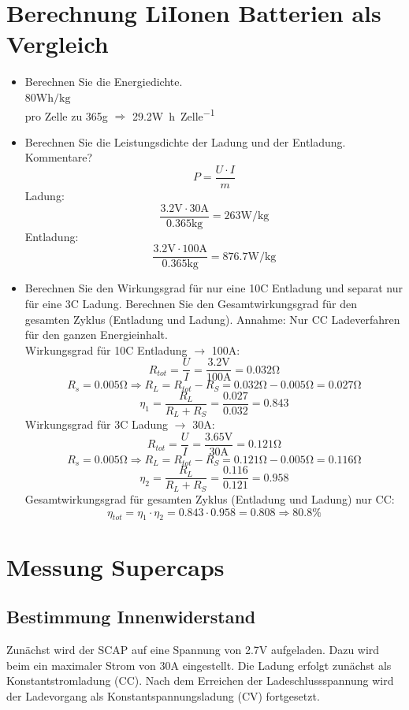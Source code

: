 \documentclass[a4,paper,fleqn]{article}
\begin{document}
\clearpage
\section{Berechnung LiIonen Batterien als Vergleich}
\begin{itemize}
\item Berechnen Sie die Energiedichte. \\
    $80\si{\watt\hour\per\kilogram}$ \\
    pro Zelle zu 365\si{\gram} $\Rightarrow$ 29.2\si{\watt\hour\per Zelle}
\item Berechnen Sie die Leistungsdichte der Ladung und der Entladung. 
Kommentare? \\
    \[ P = \frac{U \cdot I}{m} \]
    Ladung: 
    \[ \frac{3.2\si{\volt} \cdot 30\si{\ampere}}{0.365\si{\kilogram}} = 263 \si{\watt\per\kilogram} \]
    Entladung: 
    \[ \frac{3.2\si{\volt} \cdot 100\si{\ampere}}{0.365\si{\kilogram}} = 876.7 \si{\watt\per\kilogram} \]
\item  Berechnen Sie den Wirkungsgrad für nur eine 10C Entladung und separat 
nur für eine 3C Ladung.  Berechnen Sie den Gesamtwirkungsgrad für den 
gesamten Zyklus (Entladung und Ladung).  Annahme: Nur CC Ladeverfahren für 
den ganzen Energieinhalt. \\
    Wirkungsgrad für 10C Entladung $\to$ 100\si{\ampere}: 
    \[ R_{tot} = \frac{U}{I} = \frac{3.2\si{\volt}}{100\si{\ampere}} 
    = 0.032\si{\ohm} \]
    \[ R_s = 0.005\si{\ohm} \Rightarrow R_L 
    = R_{tot} - R_S = 0.032\si{\ohm} - 0.005\si{\ohm} = 0.027\si{\ohm} \]
    \[ \eta_1 = \frac{R_L}{R_L + R_S} = \frac{0.027}{0.032} = 0.843 \]
    Wirkungsgrad für 3C Ladung $\to$ 30\si{\ampere}: 
    \[ R_{tot} = \frac{U}{I} = \frac{3.65\si{\volt}}{30\si{\ampere}} 
    = 0.121\si{\ohm} \]
    \[ R_s = 0.005\si{\ohm} \Rightarrow R_L 
    = R_{tot} - R_S = 0.121\si{\ohm} - 0.005\si{\ohm} = 0.116\si{\ohm} \]
    \[ \eta_2 = \frac{R_L}{R_L + R_S} = \frac{0.116}{0.121} = 0.958 \]
    Gesamtwirkungsgrad für gesamten Zyklus (Entladung und Ladung) nur CC: \\
    \[ \eta_{tot} = \eta_1 \cdot \eta_2 = 0.843 \cdot 0.958 
    = 0.808 \Rightarrow 80.8\% \]
\end{itemize}

\clearpage
\section{Messung Supercaps}
\subsection{Bestimmung Innenwiderstand}
Zunächst wird der SCAP auf eine Spannung von 2.7\si{\volt} aufgeladen. Dazu 
wird beim ein maximaler Strom von 30\si{\ampere} eingestellt. Die Ladung 
erfolgt zunächst als Konstantstromladung (CC). Nach dem Erreichen der 
Ladeschlussspannung wird der Ladevorgang als Konstantspannungsladung (CV) 
fortgesetzt. 
\end{document}

